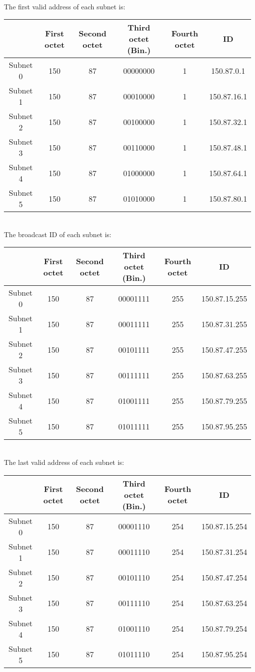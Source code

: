 \documentclass{article}
\begin{document}
~\\The first valid address of each subnet is:
\begin{table}[h!]
\centering
\begin{tabular}{|c|c|c|c|c|c|}
\hline
& First octet & Second octet & Third octet (Bin.) & Fourth octet & ID \\ \hline
Subnet 0 & 150 & 87 & 00000000 & 1 & 150.87.0.1 \\
Subnet 1 & 150 & 87 & 00010000 & 1 & 150.87.16.1 \\
Subnet 2 & 150 & 87 & 00100000 & 1 & 150.87.32.1 \\
Subnet 3 & 150 & 87 & 00110000 & 1 & 150.87.48.1\\
Subnet 4 & 150 & 87 & 01000000 & 1 & 150.87.64.1\\
Subnet 5 & 150 & 87 & 01010000 & 1 & 150.87.80.1\\ \hline
\end{tabular}
\end{table}


~\\ The broadcast ID of each subnet is:
\begin{table}[h!]
\centering
\begin{tabular}{|c|c|c|c|c|c|}
\hline
& First octet & Second octet & Third octet (Bin.) & Fourth octet & ID \\ \hline
Subnet 0 & 150 & 87 & 00001111 & 255 & 150.87.15.255 \\
Subnet 1 & 150 & 87 & 00011111 & 255 & 150.87.31.255 \\
Subnet 2 & 150 & 87 & 00101111 & 255 & 150.87.47.255 \\
Subnet 3 & 150 & 87 & 00111111 & 255 & 150.87.63.255 \\
Subnet 4 & 150 & 87 & 01001111 & 255 & 150.87.79.255 \\
Subnet 5 & 150 & 87 & 01011111 & 255 & 150.87.95.255 \\ \hline
\end{tabular}
\end{table}


~\\ The last valid address of each subnet is:
\begin{table}[h!]
\centering
\begin{tabular}{|c|c|c|c|c|c|}
\hline
& First octet & Second octet & Third octet (Bin.) & Fourth octet & ID \\ \hline
Subnet 0 & 150 & 87 & 00001110 & 254 & 150.87.15.254 \\
Subnet 1 & 150 & 87 & 00011110 & 254 & 150.87.31.254 \\
Subnet 2 & 150 & 87 & 00101110 & 254 & 150.87.47.254 \\
Subnet 3 & 150 & 87 & 00111110 & 254 & 150.87.63.254 \\
Subnet 4 & 150 & 87 & 01001110 & 254 & 150.87.79.254 \\
Subnet 5 & 150 & 87 & 01011110 & 254 & 150.87.95.254 \\ \hline
\end{tabular}
\end{table}
\end{document}
